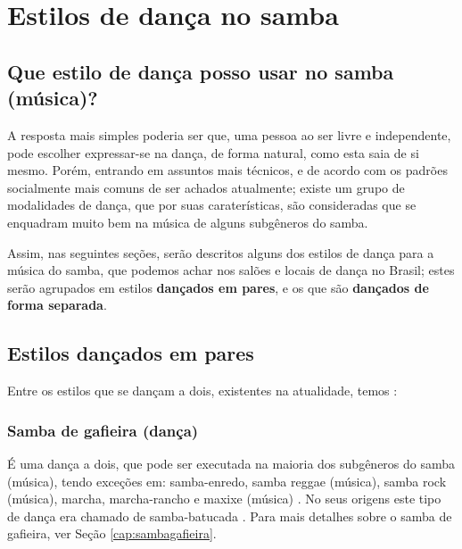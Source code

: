 
\chapter{Estilos de dança no samba}

\section{Que estilo de dança posso usar no samba (música)?}
\label{subsec:estilosdedanca}
A resposta mais simples poderia ser que, uma pessoa ao ser livre e independente,
pode escolher expressar-se na dança, de forma natural, como esta saia de si mesmo.
Porém, entrando em assuntos mais técnicos, 
e de acordo com os padrões socialmente mais comuns de ser achados atualmente;
existe um grupo de modalidades de dança, que por suas caraterísticas, 
são consideradas que se enquadram muito bem na música de alguns subgêneros do samba.

Assim, nas seguintes seções, serão descritos alguns dos estilos de dança para a música do samba,  
que podemos achar nos salões e locais de dança no Brasil;
estes serão agrupados em estilos \textbf{dançados em pares}, e os que são \textbf{dançados de forma separada}. 


\section{Estilos dançados em pares}
\label{subsec:estilosdedancapares}
Entre os estilos que se dançam a dois, existentes na atualidade, temos \cite[pp. 134]{perna2002samba}:

\subsection{Samba de gafieira (dança)} 
É uma dança a dois, que pode ser executada na maioria dos subgêneros do samba (música),
tendo exceções em: samba-enredo, samba reggae (música), samba rock (música), 
marcha, marcha-rancho e maxixe (música) \cite[pp. 134]{perna2002samba}.
No seus origens este tipo de dança era chamado de samba-batucada  \cite[pp. 134]{perna2002samba}. 
Para mais detalhes sobre o samba de gafieira, ver Seção \ref{cap:sambagafieira}.

